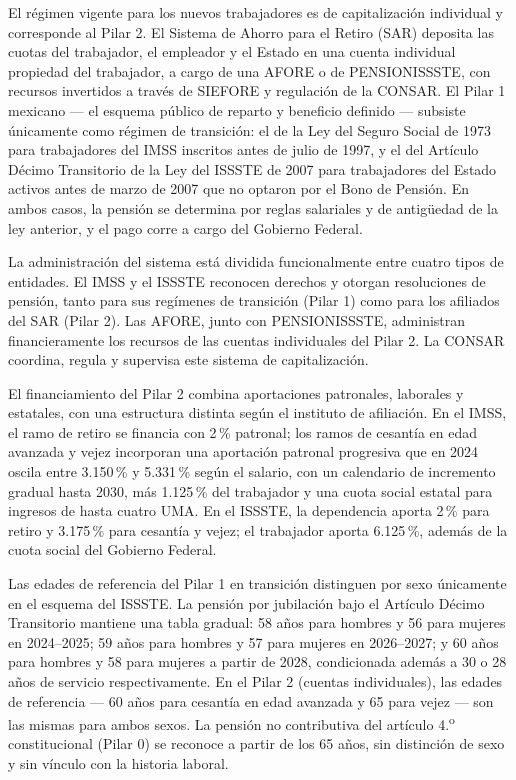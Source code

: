 \documentclass[12pt, letterpaper]{article}
\begin{document}
El régimen vigente para los nuevos trabajadores es de capitalización individual y corresponde al Pilar 2. El Sistema de Ahorro para el Retiro (SAR) deposita las cuotas del trabajador, el empleador y el Estado en una cuenta individual propiedad del trabajador, a cargo de una AFORE o de PENSIONISSSTE, con recursos invertidos a través de SIEFORE y regulación de la CONSAR. El Pilar 1 mexicano --- el esquema público de reparto y beneficio definido --- subsiste únicamente como régimen de transición: el de la Ley del Seguro Social de 1973 para trabajadores del IMSS inscritos antes de julio de 1997, y el del Artículo Décimo Transitorio de la Ley del ISSSTE de 2007 para trabajadores del Estado activos antes de marzo de 2007 que no optaron por el Bono de Pensión. En ambos casos, la pensión se determina por reglas salariales y de antigüedad de la ley anterior, y el pago corre a cargo del Gobierno Federal.

La administración del sistema está dividida funcionalmente entre cuatro tipos de entidades. El IMSS y el ISSSTE reconocen derechos y otorgan resoluciones de pensión, tanto para sus regímenes de transición (Pilar 1) como para los afiliados del SAR (Pilar 2). Las AFORE, junto con PENSIONISSSTE, administran financieramente los recursos de las cuentas individuales del Pilar 2. La CONSAR coordina, regula y supervisa este sistema de capitalización.

El financiamiento del Pilar 2 combina aportaciones patronales, laborales y estatales, con una estructura distinta según el instituto de afiliación. En el IMSS, el ramo de retiro se financia con 2\,\% patronal; los ramos de cesantía en edad avanzada y vejez incorporan una aportación patronal progresiva que en 2024 oscila entre 3.150\,\% y 5.331\,\% según el salario, con un calendario de incremento gradual hasta 2030, más 1.125\,\% del trabajador y una cuota social estatal para ingresos de hasta cuatro UMA. En el ISSSTE, la dependencia aporta 2\,\% para retiro y 3.175\,\% para cesantía y vejez; el trabajador aporta 6.125\,\%, además de la cuota social del Gobierno Federal.

Las edades de referencia del Pilar 1 en transición distinguen por sexo únicamente en el esquema del ISSSTE. La pensión por jubilación bajo el Artículo Décimo Transitorio mantiene una tabla gradual: 58 años para hombres y 56 para mujeres en 2024--2025; 59 años para hombres y 57 para mujeres en 2026--2027; y 60 años para hombres y 58 para mujeres a partir de 2028, condicionada además a 30 o 28 años de servicio respectivamente. En el Pilar 2 (cuentas individuales), las edades de referencia --- 60 años para cesantía en edad avanzada y 65 para vejez --- son las mismas para ambos sexos. La pensión no contributiva del artículo 4.\textsuperscript{o} constitucional (Pilar 0) se reconoce a partir de los 65 años, sin distinción de sexo y sin vínculo con la historia laboral.
\end{document}
